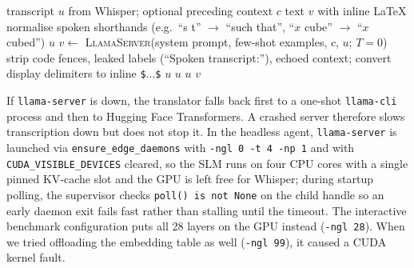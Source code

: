 \documentclass[11pt,a4paper,oneside]{report}
\theoremstyle{definition}
\newcommand{\code}[1]{\texttt{\small #1}}
\begin{document}
\begin{algorithm}[ht]
\caption{Typesetting one utterance with the SLM (headless agent).}
\label{alg:slm}
\begin{algorithmic}[1]
\Require transcript $u$ from Whisper; optional preceding context $c$
\Ensure text $v$ with inline LaTeX
\State normalise spoken shorthands (e.g.\ ``s t'' $\to$ ``such that'', ``$x$ cube'' $\to$ ``$x$ cubed'')
 \Return $u$ 
\EndIf
\State $v \gets$ \textsc{LlamaServer}(system prompt, few-shot examples, $c$, $u$; $T=0$)
\State strip code fences, leaked labels (``Spoken transcript:''), echoed context; convert display delimiters to inline \texttt{\$}$\ldots$\texttt{\$}
 \Return $u$ 
\EndIf
{} \Return $u$ 
\EndIf
{} \Return $u$ 
\EndIf
\State \Return $v$
\end{algorithmic}
\end{algorithm}

If \texttt{llama-server} is down, the translator falls back first to a one-shot \texttt{llama-cli} process and then to Hugging Face Transformers. A crashed server therefore slows transcription down but does not stop it. In the headless agent, \texttt{llama-server} is launched via \code{ensure\_edge\_daemons} with \code{-ngl 0 -t 4 -np 1} and with \code{CUDA\_VISIBLE\_DEVICES} cleared, so the SLM runs on four CPU cores with a single pinned KV-cache slot and the GPU is left free for Whisper; during startup polling, the supervisor checks \code{poll() is not None} on the child handle so an early daemon exit fails fast rather than stalling until the timeout. The interactive benchmark configuration puts all 28 layers on the GPU instead (\code{-ngl 28}). When we tried offloading the embedding table as well (\code{-ngl 99}), it caused a CUDA kernel fault.
\end{document}
